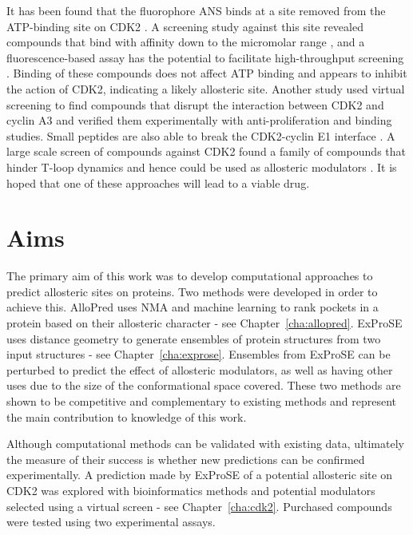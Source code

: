 It has been found that the fluorophore ANS binds at a site removed from the ATP-binding site on CDK2 \cite{Betzi2011}.
A screening study against this site revealed compounds that bind with affinity down to the micromolar range \cite{Rastelli2014}, and a fluorescence-based assay has the potential to facilitate high-throughput screening \cite{Martin2012}.
Binding of these compounds does not affect ATP binding and appears to inhibit the action of CDK2, indicating a likely allosteric site.
Another study used virtual screening to find compounds that disrupt the interaction between CDK2 and cyclin A3 \cite{Hu2015} and verified them experimentally with anti-proliferation and binding studies.
Small peptides are also able to break the CDK2-cyclin E1 interface \cite{Chen2014}.
A large scale screen of compounds against CDK2 found a family of compounds that hinder T-loop dynamics and hence could be used as allosteric modulators \cite{Pellerano2017}.
It is hoped that one of these approaches will lead to a viable drug.


\section{Aims}
\label{sec:introduction_aims}

The primary aim of this work was to develop computational approaches to predict allosteric sites on proteins.
Two methods were developed in order to achieve this.
AlloPred uses NMA and machine learning to rank pockets in a protein based on their allosteric character - see Chapter~\ref{cha:allopred}.
ExProSE uses distance geometry to generate ensembles of protein structures from two input structures - see Chapter~\ref{cha:exprose}.
Ensembles from ExProSE can be perturbed to predict the effect of allosteric modulators, as well as having other uses due to the size of the conformational space covered.
These two methods are shown to be competitive and complementary to existing methods and represent the main contribution to knowledge of this work.

Although computational methods can be validated with existing data, ultimately the measure of their success is whether new predictions can be confirmed experimentally.
A prediction made by ExProSE of a potential allosteric site on CDK2 was explored with bioinformatics methods and potential modulators selected using a virtual screen - see Chapter~\ref{cha:cdk2}.
Purchased compounds were tested using two experimental assays.

